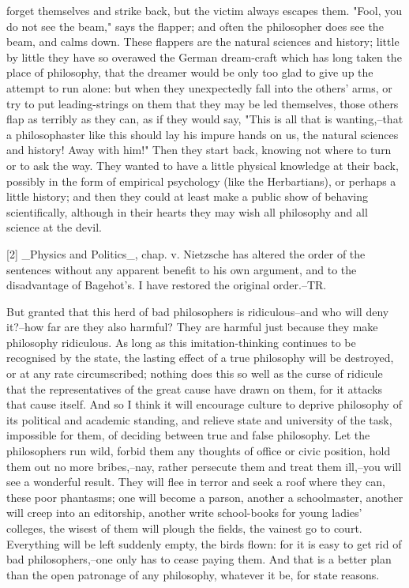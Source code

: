 forget themselves and strike back, but the victim always escapes
them. "Fool, you do not see the beam," says the flapper; and often
the philosopher does see the beam, and calms down. These flappers are
the natural sciences and history; little by little they have so
overawed the German dream-craft which has long taken the place of
philosophy, that the dreamer would be only too glad to give up the
attempt to run alone: but when they unexpectedly fall into the
others' arms, or try to put leading-strings on them that they may be
led themselves, those others flap as terribly as they can, as if they
would say, "This is all that is wanting,--that a philosophaster like
this should lay his impure hands on us, the natural sciences and
history! Away with him!" Then they start back, knowing not where to
turn or to ask the way. They wanted to have a little physical
knowledge at their back, possibly in the form of empirical psychology
(like the Herbartians), or perhaps a little history; and then they
could at least make a public show of behaving scientifically,
although in their hearts they may wish all philosophy and all science
at the devil.

    [2] _Physics and Politics_, chap. v. Nietzsche has altered the
    order of the sentences without any apparent benefit to his own
    argument, and to the disadvantage of Bagehot's. I have restored
    the original order.--TR.

But granted that this herd of bad philosophers is ridiculous--and who
will deny it?--how far are they also harmful? They are harmful just
because they make philosophy ridiculous. As long as this
imitation-thinking continues to be recognised by the state, the
lasting effect of a true philosophy will be destroyed, or at any rate
circumscribed; nothing does this so well as the curse of ridicule
that the representatives of the great cause have drawn on them, for
it attacks that cause itself. And so I think it will encourage
culture to deprive philosophy of its political and academic standing,
and relieve state and university of the task, impossible for them, of
deciding between true and false philosophy. Let the philosophers run
wild, forbid them any thoughts of office or civic position, hold them
out no more bribes,--nay, rather persecute them and treat them
ill,--you will see a wonderful result. They will flee in terror and
seek a roof where they can, these poor phantasms; one will become a
parson, another a schoolmaster, another will creep into an
editorship, another write school-books for young ladies' colleges,
the wisest of them will plough the fields, the vainest go to court.
Everything will be left suddenly empty, the birds flown: for it is
easy to get rid of bad philosophers,--one only has to cease paying
them. And that is a better plan than the open patronage of any
philosophy, whatever it be, for state reasons.

